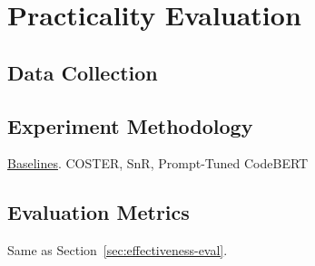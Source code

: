 \section{Practicality Evaluation}
\label{sec:eval}

\subsection{Data Collection}

\subsection{Experiment Methodology}
\underline{Baselines}. COSTER, SnR, Prompt-Tuned CodeBERT

\subsection{Evaluation Metrics}
Same as Section~\ref{sec:effectiveness-eval}.


